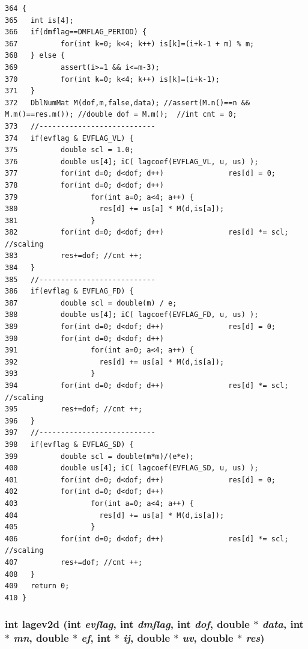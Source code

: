 \footnotesize\begin{verbatim}364 {
365   int is[4];
366   if(dmflag==DMFLAG_PERIOD) {
367          for(int k=0; k<4; k++) is[k]=(i+k-1 + m) % m;
368   } else {
369          assert(i>=1 && i<=m-3);
370          for(int k=0; k<4; k++) is[k]=(i+k-1);
371   }
372   DblNumMat M(dof,m,false,data); //assert(M.n()==n && M.m()==res.m()); //double dof = M.m();  //int cnt = 0;
373   //---------------------------
374   if(evflag & EVFLAG_VL) {
375          double scl = 1.0;
376          double us[4]; iC( lagcoef(EVFLAG_VL, u, us) );
377          for(int d=0; d<dof; d++)               res[d] = 0;
378          for(int d=0; d<dof; d++) 
379                 for(int a=0; a<4; a++) {
380                   res[d] += us[a] * M(d,is[a]);
381                 }
382          for(int d=0; d<dof; d++)               res[d] *= scl; //scaling
383          res+=dof; //cnt ++;
384   }
385   //---------------------------
386   if(evflag & EVFLAG_FD) {
387          double scl = double(m) / e;
388          double us[4]; iC( lagcoef(EVFLAG_FD, u, us) );
389          for(int d=0; d<dof; d++)               res[d] = 0;
390          for(int d=0; d<dof; d++)
391                 for(int a=0; a<4; a++) {
392                   res[d] += us[a] * M(d,is[a]);
393                 }
394          for(int d=0; d<dof; d++)               res[d] *= scl; //scaling
395          res+=dof; //cnt ++;
396   }
397   //---------------------------
398   if(evflag & EVFLAG_SD) {
399          double scl = double(m*m)/(e*e);
400          double us[4]; iC( lagcoef(EVFLAG_SD, u, us) );
401          for(int d=0; d<dof; d++)               res[d] = 0;
402          for(int d=0; d<dof; d++)
403                 for(int a=0; a<4; a++) {
404                   res[d] += us[a] * M(d,is[a]);
405                 }
406          for(int d=0; d<dof; d++)               res[d] *= scl; //scaling
407          res+=dof; //cnt ++;
408   }
409   return 0;
410 }
\end{verbatim}\normalsize 


\subsubsection{\setlength{\rightskip}{0pt plus 5cm}int lagev2d (int {\em evflag}, int {\em dmflag}, int {\em dof}, double $\ast$ {\em data}, int $\ast$ {\em mn}, double $\ast$ {\em ef}, int $\ast$ {\em ij}, double $\ast$ {\em uv}, double $\ast$ {\em res})}\label{vecmatop_8cpp_528325b85b0a7a41f0383496c8c656ae_528325b85b0a7a41f0383496c8c656ae}




